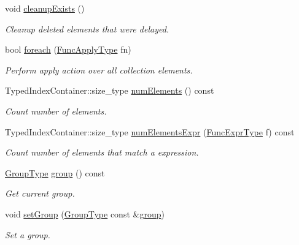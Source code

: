 \begin{DoxyCompactItemize}
void \hyperlink{structvt_1_1vrt_1_1collection_1_1_holder_aa6641e97e87778904b76dba93a69bb56}{cleanup\+Exists} ()
\begin{DoxyCompactList}\small\item\em Cleanup deleted elements that were delayed. \end{DoxyCompactList}\item 
bool \hyperlink{structvt_1_1vrt_1_1collection_1_1_holder_a9cd9b190a9e1cf6726c520623a2ff4d2}{foreach} (\hyperlink{structvt_1_1vrt_1_1collection_1_1_holder_a26e20d23447e935e218a07ffd638706d}{Func\+Apply\+Type} fn)
\begin{DoxyCompactList}\small\item\em Perform apply action over all collection elements. \end{DoxyCompactList}\item 
Typed\+Index\+Container\+::size\+\_\+type \hyperlink{structvt_1_1vrt_1_1collection_1_1_holder_aebff9d8a0b857688bf3b303cb832b543}{num\+Elements} () const
\begin{DoxyCompactList}\small\item\em Count number of elements. \end{DoxyCompactList}\item 
Typed\+Index\+Container\+::size\+\_\+type \hyperlink{structvt_1_1vrt_1_1collection_1_1_holder_aafc7aad37f14db35c91d3e085bdf0500}{num\+Elements\+Expr} (\hyperlink{structvt_1_1vrt_1_1collection_1_1_holder_a5c28963c09fd935028444c5a09fada2d}{Func\+Expr\+Type} f) const
\begin{DoxyCompactList}\small\item\em Count number of elements that match a expression. \end{DoxyCompactList}\item 
\hyperlink{namespacevt_a27b5e4411c9b6140c49100e050e2f743}{Group\+Type} \hyperlink{structvt_1_1vrt_1_1collection_1_1_holder_a579e33999a2d66ded9c3751be3ba11f8}{group} () const
\begin{DoxyCompactList}\small\item\em Get current group. \end{DoxyCompactList}\item 
void \hyperlink{structvt_1_1vrt_1_1collection_1_1_holder_ad1004d701690d7de8d323de1d5bc1a29}{set\+Group} (\hyperlink{namespacevt_a27b5e4411c9b6140c49100e050e2f743}{Group\+Type} const \&\hyperlink{structvt_1_1vrt_1_1collection_1_1_holder_a579e33999a2d66ded9c3751be3ba11f8}{group})
\begin{DoxyCompactList}\small\item\em Set a group. \end{DoxyCompactList}\item 

\end{DoxyCompactItemize}
